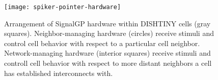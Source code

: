 \begin{figure}[t]
\begin{center}
\texttt{[image: spiker-pointer-hardware]}
\caption{
Arrangement of SignalGP hardware within DISHTINY cells (gray squares).
Neighbor-managing hardware (circles) receive stimuli and control cell behavior with respect to a particular cell neighbor.
Network-managing hardware (interior squares) receive stimuli and controll cell behavior with respect to more distant neighbors a cell has established interconnects with.
}
\label{fig:spiker_pointer_hardware}
\end{center}
\end{figure}
